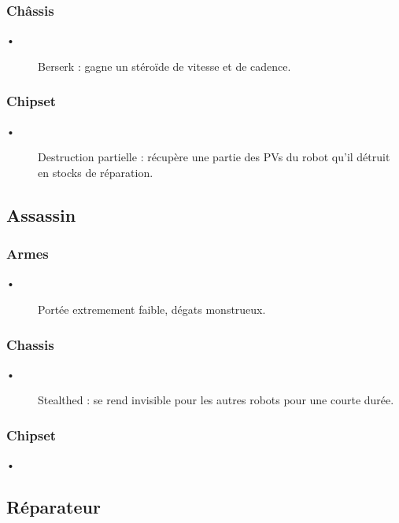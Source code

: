 \documentclass[10pt]{article}
\begin{document}
\subsubsection*{Châssis}
\begin{description}
\item [•] Berserk : gagne un stéroïde de vitesse et de cadence.
\end{description}

\subsubsection*{Chipset}
\begin{description}
\item [•] Destruction partielle : récupère une partie des PVs du robot qu'il détruit en stocks de réparation.
\end{description}

\subsection{Assassin}
\subsubsection*{Armes}
\begin{description}
\item [•] Portée extremement faible, dégats monstrueux.
\end{description}

\subsubsection*{Chassis}
\begin{description}
\item [•] Stealthed : se rend invisible pour les autres robots pour une courte durée. 
\end{description}

\subsubsection*{Chipset}
\begin{description}
\item [•] 
\end{description}

\subsection{Réparateur}
\end{document}
